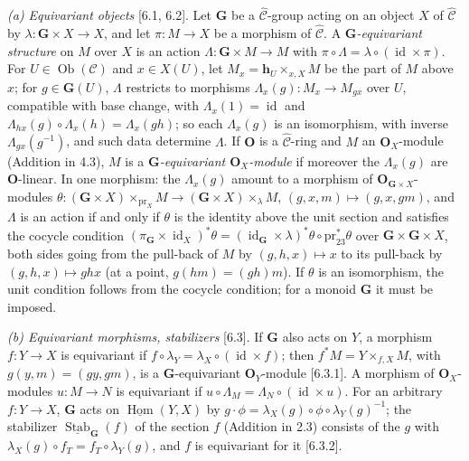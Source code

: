 \par\smallskip\noindent\textit{(a) Equivariant objects} [6.1, 6.2].
Let \(\mathbf G\) be a \(\widehat{\mathscr C}\)-group acting on an object
\(X\) of \(\widehat{\mathscr C}\) by \(\lambda:\mathbf G\times X\to X\), and
let \(\pi:M\to X\) be a morphism of \(\widehat{\mathscr C}\). A
\emph{\(\mathbf G\)-equivariant structure} on \(M\) over \(X\) is an action
\(\Lambda:\mathbf G\times M\to M\) with
\(\pi\circ\Lambda=\lambda\circ(\operatorname{id}\times\pi)\). For
\(U\in\operatorname{Ob}(\mathscr C)\) and \(x\in X(U)\), let
\(M_x=\mathbf h_U\times_{x,X}M\) be the part of \(M\) above \(x\); for
\(g\in\mathbf G(U)\), \(\Lambda\) restricts to morphisms
\(\Lambda_x(g):M_x\to M_{gx}\) over \(U\), compatible with base change, with
\(\Lambda_x(1)=\operatorname{id}\) and
\(\Lambda_{hx}(g)\circ\Lambda_x(h)=\Lambda_x(gh)\); so each \(\Lambda_x(g)\)
is an isomorphism, with inverse \(\Lambda_{gx}(g^{-1})\), and such data
determine \(\Lambda\). If \(\mathbf O\) is a \(\widehat{\mathscr C}\)-ring and
\(M\) an \(\mathbf O_X\)-module (Addition in 4.3), \(M\) is a
\emph{\(\mathbf G\)-equivariant \(\mathbf O_X\)-module} if moreover the
\(\Lambda_x(g)\) are \(\mathbf O\)-linear. In one morphism: the
\(\Lambda_x(g)\) amount to a morphism of
\(\mathbf O_{\mathbf G\times X}\)-modules
\(\theta:(\mathbf G\times X)\times_{\mathrm{pr}_X}M\to(\mathbf G\times X)\times_\lambda M\),
\((g,x,m)\mapsto(g,x,gm)\), and \(\Lambda\) is an action if and only if
\(\theta\) is the identity above the unit section and satisfies the cocycle
condition
\((\pi_{\mathbf G}\times\operatorname{id}_X)^*\theta
=(\operatorname{id}_{\mathbf G}\times\lambda)^*\theta\circ\mathrm{pr}_{23}^*\theta\)
over \(\mathbf G\times\mathbf G\times X\), both sides going from the
pull-back of \(M\) by \((g,h,x)\mapsto x\) to its pull-back by
\((g,h,x)\mapsto ghx\) (at a point, \(g(hm)=(gh)m\)). If \(\theta\) is an
isomorphism, the unit condition follows from the cocycle condition; for a
monoid \(\mathbf G\) it must be imposed.

\par\smallskip\noindent\textit{(b) Equivariant morphisms, stabilizers} [6.3].
If \(\mathbf G\) also acts on \(Y\), a morphism \(f:Y\to X\) is equivariant
if \(f\circ\lambda_Y=\lambda_X\circ(\operatorname{id}\times f)\); then
\(f^*M=Y\times_{f,X}M\), with \(g(y,m)=(gy,gm)\), is a
\(\mathbf G\)-equivariant \(\mathbf O_Y\)-module [6.3.1]. A morphism of
\(\mathbf O_X\)-modules \(u:M\to N\) is equivariant if
\(u\circ\Lambda_M=\Lambda_N\circ(\operatorname{id}\times u)\). For an
arbitrary \(f:Y\to X\), \(\mathbf G\) acts on
\(\underline{\operatorname{Hom}}(Y,X)\) by
\(g\cdot\phi=\lambda_X(g)\circ\phi\circ\lambda_Y(g)^{-1}\); the stabilizer
\(\underline{\operatorname{Stab}}_{\mathbf G}(f)\) of the section \(f\)
(Addition in 2.3) consists of the \(g\) with
\(\lambda_X(g)\circ f_T=f_T\circ\lambda_Y(g)\), and \(f\) is equivariant for
it [6.3.2].

